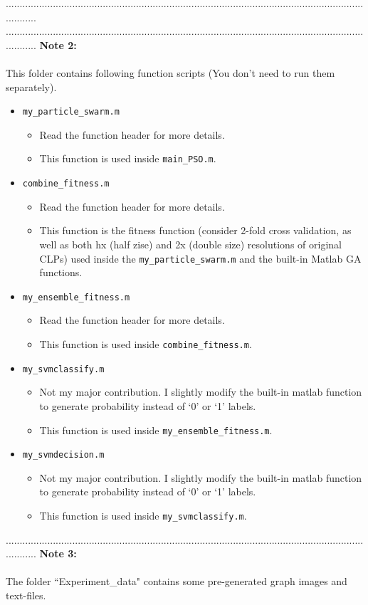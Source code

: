 \documentclass[a4paper,12pt]{article} %
\begin{document}
............................................................................................................................................
\newpage
............................................................................................................................................
\textbf{Note 2: }\\\\
This folder contains following function scripts (You don't need to run them separately).
\begin{itemize}
	
	\item \verb|my_particle_swarm.m|
	\begin{itemize}
		\item Read the function header for more details.
		\item This function is used inside \verb|main_PSO.m|.
	\end{itemize}
	\item \verb|combine_fitness.m|
	\begin{itemize}
		\item Read the function header for more details.
		\item This function is the fitness function (consider 2-fold cross validation, as well as both hx (half zise) and 2x (double size) resolutions of original CLPs) used inside the \verb|my_particle_swarm.m| and the built-in Matlab GA functions.

	\end{itemize}
	\item \verb|my_ensemble_fitness.m|
	\begin{itemize}
		\item Read the function header for more details.
		\item This function is used inside \verb|combine_fitness.m|.
	\end{itemize}
	\item \verb|my_svmclassify.m|
	\begin{itemize}
		\item Not my major contribution. I slightly modify the built-in matlab function to generate probability instead of `0' or `1' labels. 
		\item This function is used inside \verb|my_ensemble_fitness.m|.
	\end{itemize}
	\item \verb|my_svmdecision.m|
	\begin{itemize}
		\item Not my major contribution. I slightly modify the built-in matlab function to generate probability instead of `0' or `1' labels. 
		\item This function is used inside \verb|my_svmclassify.m|.
	\end{itemize}
	
\end{itemize}
............................................................................................................................................
\textbf{Note 3: }\\\\
The folder ``Experiment\_data" contains some pre-generated graph images and text-files.
\end{document}
